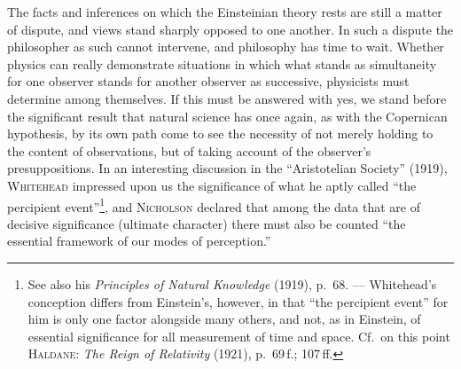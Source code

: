 \documentclass[12pt]{article}
\newcommand{\opage}[1]{\marginnote{\footnotesize\textit{[#1]}}}
\begin{document}
The facts and inferences on which the Einsteinian theory rests are still
a matter of dispute, and views stand sharply opposed to one another. In
such a dispute the philosopher as such cannot intervene, and philosophy
has time to wait. Whether physics can really demonstrate situations in
which what stands as simultaneity for one observer stands for another
observer as \opage{75}successive, physicists must determine among themselves. If
this must be answered with yes, we stand before the significant result
that natural science has once again, as with the Copernican hypothesis,
by its own path come to see the necessity of not merely holding to the
content of observations, but of taking account of the observer's
presuppositions. In an interesting discussion in the ``Aristotelian
Society'' (1919), \textsc{Whitehead} impressed upon us the significance of
what he aptly called ``the percipient event''\footnote{See also his
  \textit{Principles of Natural Knowledge} (1919), p.~68. --- Whitehead's
  conception differs from Einstein's, however, in that ``the percipient
  event'' for him is only one factor alongside many others, and not, as in
  Einstein, of essential significance for all measurement of time and
  space. Cf.\ on this point \textsc{Haldane}: \textit{The Reign of
  Relativity} (1921), p.~69\,f.; 107\,ff.},
and \textsc{Nicholson} declared that among the data that are of decisive
significance (ultimate character) there must also be counted ``the
essential framework of our modes of perception.''
\end{document}
